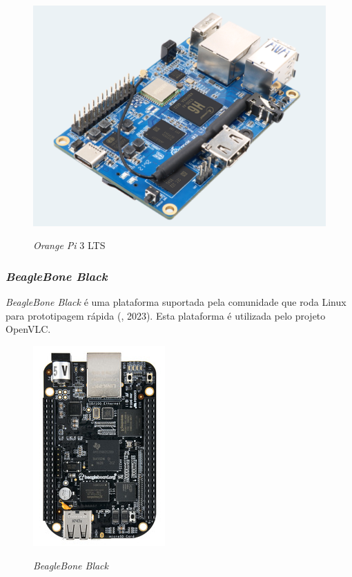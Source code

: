 \begin{figure}[!htbp]
  \caption{\textit{Orange Pi} 3 LTS}
  \includegraphics[scale=0.35]{images/orange.png}
  \label{figura:orange}
\end{figure}

\subsubsection{\textit{BeagleBone Black}}

\textit{BeagleBone Black} é uma plataforma suportada pela comunidade que roda Linux para prototipagem rápida (\textit{\citeauthor{beaglebone}}, 2023).
Esta plataforma é utilizada pelo projeto OpenVLC. 

\begin{figure}[!htbp]
  \caption{\textit{BeagleBone Black}}
  \includegraphics[scale=0.58]{images/beaglebone.png}
  \label{figura:beagle}
\end{figure}

